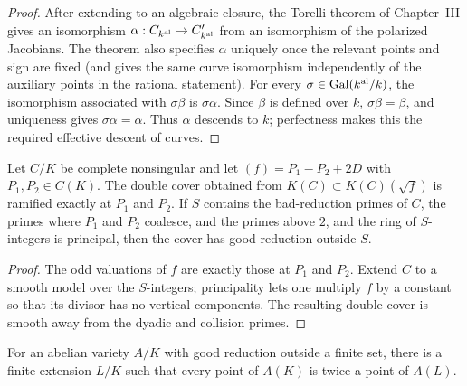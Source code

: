 \begin{proof}

After extending to an algebraic closure, the Torelli theorem of
Chapter~III gives an isomorphism $\alpha:C_{k^{\rm al}}\to C'_{k^{\rm al}}$
from an isomorphism of the polarized Jacobians.  The theorem also specifies
$\alpha$ uniquely once the relevant points and sign are fixed (and gives the
same curve isomorphism independently of the auxiliary points in the rational
statement).  For every $\sigma\in\operatorname{Gal}(k^{\rm al}/k)$, the
isomorphism associated with $\sigma\beta$ is $\sigma\alpha$.  Since $\beta$ is
defined over $k$, $\sigma\beta=\beta$, and uniqueness gives
$\sigma\alpha=\alpha$.  Thus $\alpha$ descends to $k$; perfectness makes this
the required effective descent of curves.

\end{proof}


\begin{lemma}
\label{lem:milne-parshin-cover-construction}

Let $C/K$ be complete nonsingular and let
$(f)=P_1-P_2+2D$ with $P_1,P_2\in C(K)$.  The double cover obtained from
$K(C)\subset K(C)(\sqrt f)$ is ramified exactly at $P_1$ and $P_2$.  If $S$
contains the bad-reduction primes of $C$, the primes where $P_1$ and $P_2$
coalesce, and the primes above $2$, and the ring of $S$-integers is principal,
then the cover has good reduction outside $S$.
\end{lemma}

\begin{proof}

The odd valuations of $f$ are exactly those at $P_1$ and $P_2$.  Extend $C$
to a smooth model over the $S$-integers; principality lets one multiply $f$ by
a constant so that its divisor has no vertical components.  The resulting
double cover is smooth away from the dyadic and collision primes.

\end{proof}


\begin{proposition}
\label{prop:milne-weak-mordell-weil-extension}

For an abelian variety $A/K$ with good reduction outside a finite set, there
is a finite extension $L/K$ such that every point of $A(K)$ is twice a point
of $A(L)$.
\end{proposition}

